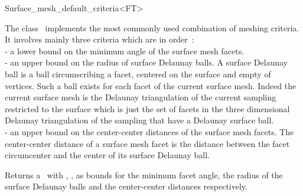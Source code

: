 

\begin{ccRefClass}{Surface_mesh_default_criteria<FT>}  %


\ccDefinition
  
The class \ccRefName\  implements  the most commonly used combination
of meshing criteria. It involves mainly three criteria which are
in order~: \\
- a lower bound on the minimum angle of the surface mesh facets. \\
- an upper bound on the radius of surface Delaunay balls.
 A surface Delaunay ball is a  ball circumscribing  a facet,
centered on the surface and empty of vertices.
 Such a ball exists for each facet
of the current surface mesh.
Indeed  the current surface mesh
is  the Delaunay triangulation of the current sampling restricted to
the surface 
which is just the set of facets in the three dimensional  Delaunay triangulation of
the sampling  that  have a Delaunay surface ball. \\
- an upper bound on the center-center distances of the surface mesh facets.
  The center-center distance of a surface mesh facet 
  is the distance between the facet circumcenter and the 
  center of its  surface Delaunay ball. 



\ccIsModel




\ccCreation
{}  %

{Returns a \ccRefName\ with , ,
 as bounds for the minimum facet angle,
the radius of the surface Delaunay balls 
and the center-center distances respectively.}



\end{ccRefClass}
